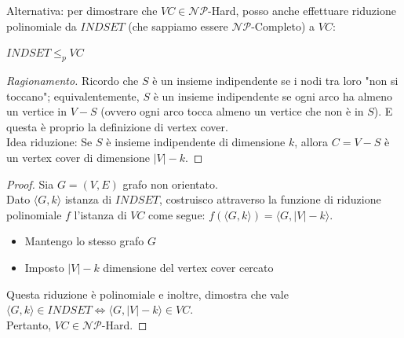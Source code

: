 \documentclass{article}  %
\theoremstyle{definition}
\newenvironment{ragionamento}[1][]
  {\begin{proof}[Ragionamento#1]\renewcommand{\qedsymbol}{}\normalfont}
  {\end{proof}}
\begin{document}
\begin{osservazioni}
	\footnotesize
	Alternativa: per dimostrare che $VC \in \mathcal{NP}$-Hard, posso anche effettuare riduzione polinomiale da $INDSET$ (che sappiamo essere $\mathcal{NP}$-Completo) a $VC$:
	\begin{center}
		$INDSET \leq_p VC$
	\end{center}
	\begin{ragionamento}
		Ricordo che $S$ è un insieme indipendente se i nodi tra loro "non si toccano"; equivalentemente, $S$ è un insieme indipendente se ogni arco ha almeno un vertice
		in $V-S$ (ovvero ogni arco tocca almeno un vertice che non è in $S$). E questa è proprio la definizione di vertex cover. \\
		Idea riduzione: Se $S$ è insieme indipendente di dimensione $k$, allora $C=V-S$ è un vertex cover di dimensione $|V|-k$.
	\end{ragionamento}
	\begin{proof}
		Sia $G=(V,E)$ grafo non orientato. \\
		Dato $\langle G,k \rangle$ istanza di $INDSET$, costruisco attraverso la funzione di riduzione polinomiale $f$ l'istanza di $VC$ come segue:
		$f(\langle G,k \rangle)=\langle G, |V|-k \rangle$.
		\begin{itemize}
			\item Mantengo lo stesso grafo $G$
			\item Imposto $|V|-k$ dimensione del vertex cover cercato
		\end{itemize}
		Questa riduzione è polinomiale e inoltre, dimostra che vale $\langle G,k \rangle \in INDSET \iff \langle G,|V|-k \rangle \in VC$. \\
		Pertanto, $VC \in \mathcal{NP}$-Hard.
	\end{proof}
\end{osservazioni}

\end{document}
